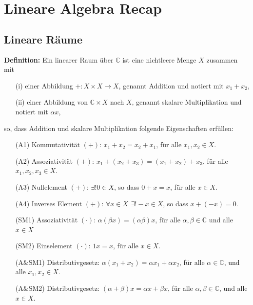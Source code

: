\documentclass[11pt]{article}
\renewcommand{\thesection}{\arabic{section}}
\begin{document}
\pagebreak


\pagebreak

\setcounter{section}{2}
\renewcommand{\thesection}{2} %
\section{Lineare Algebra Recap}

\subsection*{Lineare Räume}
\vspace*{-0.5cm}
\textbf{Definition:} Ein linearer Raum über $\mathbb{C}$ ist eine nichtleere Menge $X$ zusammen mit 
\vspace*{-0.5cm}
\begin{itemize}
    \item[(i)] einer Abbildung $+:X\times X \to X$, genannt Addition und notiert mit $x_1 + x_2$,
    \item[(ii)] einer Abbildung von $\mathbb{C} \times X$ nach $ X$, genannt skalare Multiplikation und notiert mit $\alpha x$,
\end{itemize}
\vspace*{-0.5cm}
so, dass Addition und skalare Multiplikation folgende Eigenschaften erfüllen: 
\vspace*{-0.5cm}
\begin{itemize}[leftmargin=6em]
    \item[(A1)] Kommutativität $(+)$: $x_1 + x_2 = x_2 + x_1$, für alle $x_1, x_2 \in X$.
    \item[(A2)] Assoziativität $(+)$: $x_1 + (x_2 + x_3) = (x_1 + x_2) + x_3$, für alle $x_1, x_2, x_3 \in X$.
    \item[(A3)] Nullelement $(+)$: $\exists ! 0 \in X$, so dass $0+x = x$, für alle $x \in X$. 
    \item[(A4)] Inverses Element $(+)$: $\forall x \in X \hspace{5pt} \exists ! -\!x \in X$, so dass $x + (-x) = 0$.
    \item[(SM1)] Assoziativität $(\cdot)$: $\alpha(\beta x) = (\alpha \beta)x$, für alle $\alpha, \beta \in \mathbb{C}$ und alle $x \in X$
    \item[(SM2)] Einselement $(\cdot)$: $1x = x$, für alle $x\in X$.
    \item[(A\&SM1)] Distributivgesetz: $\alpha(x_1 + x_2) = \alpha x_1 + \alpha x_2$, für alle $\alpha \in \mathbb{C}$, und alle $x_1, x_2 \in X$.
    \item[(A\&SM2)] Distributivgesetz: $(\alpha + \beta)x = \alpha x + \beta x$, für alle $\alpha, \beta \in \mathbb{C}$, und alle $x \in X$.
\end{itemize}
\vspace*{-0.5cm}
\end{document}
